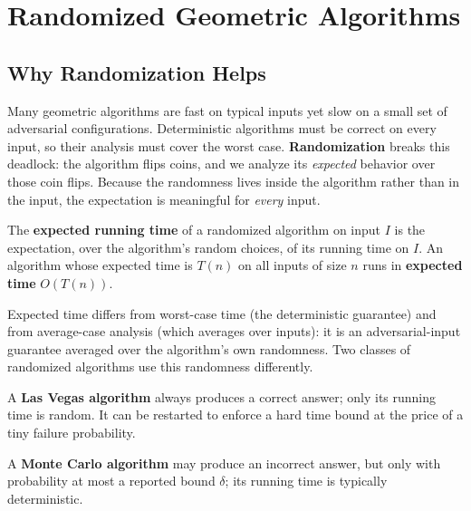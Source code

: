\chapter{Randomized Geometric Algorithms}
\label{ch:randomized_algorithms}

\section{Why Randomization Helps}
\label{sec:randomized_why}

Many geometric algorithms are fast on typical inputs yet slow on a small set of
adversarial configurations. Deterministic algorithms must be correct on every
input, so their analysis must cover the worst case. \textbf{Randomization}
 breaks this deadlock: the
algorithm flips coins, and we analyze its \emph{expected} behavior over those
coin flips. Because the randomness lives inside the algorithm rather than in
the input, the expectation is meaningful for \emph{every} input.

\begin{definition}\label{def:rand_expected_time}
  The \textbf{expected running time} of a randomized algorithm on input $I$ is
  the expectation, over the algorithm's random choices, of its running time on
  $I$. An algorithm whose expected time is $T(n)$ on all inputs of size $n$
  runs in \textbf{expected time} $O(T(n))$.
\end{definition}

Expected time differs from worst-case time (the deterministic guarantee) and
from average-case analysis (which averages over inputs): it is an
adversarial-input guarantee averaged over the algorithm's own randomness. Two
classes of randomized algorithms use this randomness differently.

\begin{definition}\label{def:rand_las_vegas}
  A \textbf{Las Vegas algorithm} always produces a correct answer; only its
  running time is random. It can be restarted to enforce a hard time bound at
  the price of a tiny failure probability.
\end{definition}

\begin{definition}\label{def:rand_monte_carlo}
  A \textbf{Monte Carlo algorithm} may produce an incorrect answer, but only
  with probability at most a reported bound $\delta$; its running time is
  typically deterministic.
\end{definition}

